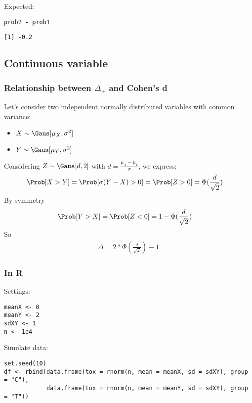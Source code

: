 \documentclass[12pt]{article}
\begin{document}
Expected:
\lstset{language=r,label= ,caption= ,captionpos=b,numbers=none}
\begin{lstlisting}
prob2 - prob1
\end{lstlisting}

\begin{verbatim}
[1] -0.2
\end{verbatim}

\clearpage

\subsection{Continuous variable}
\label{sec:org3dae1ae}
\subsubsection{Relationship between \(\Delta_+\) and Cohen's d}
\label{sec:org728a81b}
Let's consider two independent normally distributed variables with common variance:
\begin{itemize}
\item \(X \sim \Gaus[\mu_X,\sigma^2]\)
\item \(Y \sim \Gaus[\mu_Y,\sigma^2]\)
\end{itemize}
Considering \(Z \sim \Gaus[d,2]\) with \(d = \frac{\mu_X-\mu_Y}{\sigma}\), we express:
\begin{align*}
\Prob[X>Y] &= \Prob[\sigma (Y-X) >0] = \Prob[Z>0] = \Phi(\frac{d}{\sqrt{2}})
\end{align*}
By symmetry
\begin{align*}
\Prob[Y>X] &= \Prob[Z<0] = 1-\Phi(\frac{d}{\sqrt{2}})
\end{align*}
So
\begin{align*}
\Delta = 2*\Phi(\frac{d}{\sqrt{2}})-1
\end{align*}

\subsubsection{In R}
\label{sec:orgce21389}

Settings:
\lstset{language=r,label= ,caption= ,captionpos=b,numbers=none}
\begin{lstlisting}
meanX <- 0
meanY <- 2
sdXY <- 1
n <- 1e4
\end{lstlisting}

Simulate data:
\lstset{language=r,label= ,caption= ,captionpos=b,numbers=none}
\begin{lstlisting}
set.seed(10)
df <- rbind(data.frame(tox = rnorm(n, mean = meanX, sd = sdXY), group = "C"),
			data.frame(tox = rnorm(n, mean = meanY, sd = sdXY), group = "T"))
\end{lstlisting}
\end{document}
